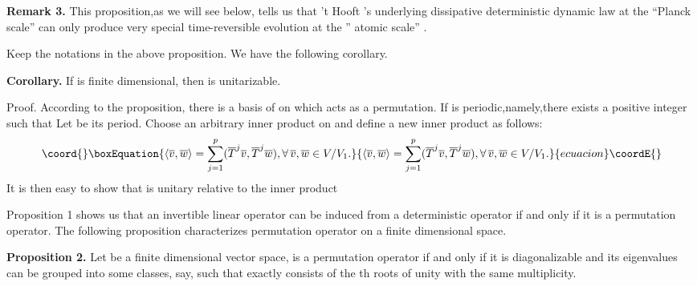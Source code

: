 \documentclass[a4paper,12pt]{article}
\begin{document}
\textbf{Remark 3.} This proposition,as we will see below, tells us that 't
Hooft 's underlying dissipative deterministic dynamic law at the ``Planck
scale'' can only produce very special time-reversible evolution at the ''
atomic scale'' .

Keep the notations in the above proposition. We have the following corollary.

\textbf{Corollary.} If \coordHE{} is finite dimensional, then \coordHE{} is
unitarizable.

Proof. According to the proposition, there is a basis of \coordHE{} on which \coordHE{} acts as a permutation. If \coordHE{} is
periodic,namely,there exists a positive integer \coordHE{} such that \coordHE{}Let \coordHE{} be its period. Choose an arbitrary inner product \myHighlight{$(\ ,\ )$}\coordHE{} on \coordHE{} and define a new inner product \myHighlight{$<\,,\,>$}\coordHE{} as follows:
\begin{equation}\coord{}\boxEquation{
\left\langle \overline{v},\overline{w}\right\rangle =\sum_{j=1}^p(\overline{T
}^j\overline{v},\overline{T}^j\overline{w}),\forall \,\overline{v},\overline{
w}\in V/V_1.
}{
\left\langle \overline{v},\overline{w}\right\rangle =\sum_{j=1}^p(\overline{T
}^j\overline{v},\overline{T}^j\overline{w}),\forall \,\overline{v},\overline{
w}\in V/V_1.
}{ecuacion}\coordE{}\end{equation}
It is then easy to show that \coordHE{} is unitary relative to the inner
product \coordHE{}

Proposition 1 shows us that an invertible linear operator can be induced
from a deterministic operator \coordHE{} if and only if it is a permutation
operator. The following proposition characterizes permutation operator on a
finite dimensional space.

\textbf{Proposition 2.} Let \coordHE{} be a finite dimensional vector space, \coordHE{}  \coordHE{} is a permutation operator if and only if it is diagonalizable
and its eigenvalues can be grouped into some classes, say, \coordHE{}such that \coordHE{} exactly consists of the \coordHE{}  \coordHE{}th roots of
unity with the same multiplicity.
\end{document}
